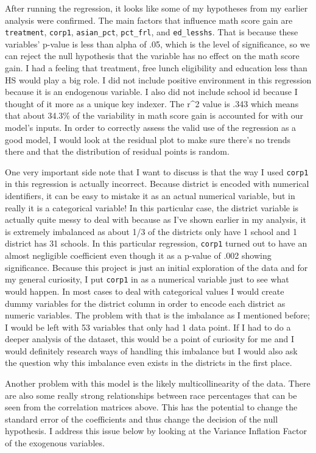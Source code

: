 \documentclass[11pt]{article}
\begin{document}
    After running the regression, it looks like some of my hypotheses from
my earlier analysis were confirmed. The main factors that influence math
score gain are \texttt{treatment}, \texttt{corp1}, \texttt{asian\_pct},
\texttt{pct\_frl}, and \texttt{ed\_lesshs}. That is because these
variables' p-value is less than alpha of .05, which is the level of
significance, so we can reject the null hypothesis that the variable has
no effect on the math score gain. I had a feeling that treatment, free
lunch eligibility and education less than HS would play a big role. I
did not include positive environment in this regression because it is an
endogenous variable. I also did not include school id because I thought
of it more as a unique key indexer. The r\^{}2 value is .343 which means
that about 34.3\% of the variability in math score gain is accounted for
with our model's inputs. In order to correctly assess the valid use of
the regression as a good model, I would look at the residual plot to
make sure there's no trends there and that the distribution of residual
points is random.

One very important side note that I want to discuss is that the way I
used \texttt{corp1} in this regression is actually incorrect. Because
district is encoded with numerical identifiers, it can be easy to
mistake it as an actual numerical variable, but in really it is a
categorical variable! In this particular case, the district variable is
actually quite messy to deal with because as I've shown earlier in my
analysis, it is extremely imbalanced as about 1/3 of the districts only
have 1 school and 1 district has 31 schools. In this particular
regression, \texttt{corp1} turned out to have an almost negligible
coefficient even though it as a p-value of .002 showing significance.
Because this project is just an initial exploration of the data and for
my general curiosity, I put \texttt{corp1} in as a numerical variable
just to see what would happen. In most cases to deal with categorical
values I would create dummy variables for the district column in order
to encode each district as numeric variables. The problem with that is
the imbalance as I mentioned before; I would be left with 53 variables
that only had 1 data point. If I had to do a deeper analysis of the
dataset, this would be a point of curiosity for me and I would
definitely research ways of handling this imbalance but I would also ask
the question why this imbalance even exists in the districts in the
first place.

Another problem with this model is the likely multicollinearity of the
data. There are also some really strong relationships between race
percentages that can be seen from the correlation matrices above. This
has the potential to change the standard error of the coefficients and
thus change the decision of the null hypothesis. I address this issue
below by looking at the Variance Inflation Factor of the exogenous
variables.
\end{document}
